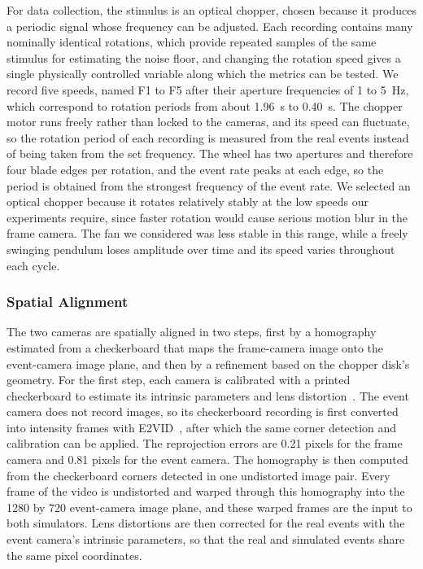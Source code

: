 
For data collection, the stimulus is an optical chopper, chosen because it produces a periodic signal whose frequency can be adjusted. Each recording contains many nominally identical rotations, which provide repeated samples of the same stimulus for estimating the noise floor, and changing the rotation speed gives a single physically controlled variable along which the metrics can be tested. We record five speeds, named F1 to F5 after their aperture frequencies of 1 to 5~Hz, which correspond to rotation periods from about 1.96~s to 0.40~s. The chopper motor runs freely rather than locked to the cameras, and its speed can fluctuate, so the rotation period of each recording is measured from the real events instead of being taken from the set frequency. The wheel has two apertures and therefore four blade edges per rotation, and the event rate peaks at each edge, so the period is obtained from the strongest frequency of the event rate. We selected an optical chopper because it rotates relatively stably at the low speeds our experiments require, since faster rotation would cause serious motion blur in the frame camera. The fan we considered was less stable in this range, while a freely swinging pendulum loses amplitude over time and its speed varies throughout each cycle.

\subsubsection{Spatial Alignment}
\label{sec:spatial-alignment}

The two cameras are spatially aligned in two steps, first by a homography estimated from a checkerboard that maps the frame-camera image onto the event-camera image plane, and then by a refinement based on the chopper disk's geometry. For the first step, each camera is calibrated with a printed checkerboard to estimate its intrinsic parameters and lens distortion~\cite{zhang2000flexible}. The event camera does not record images, so its checkerboard recording is first converted into intensity frames with E2VID~\cite{rebecq2021e2vid}, after which the same corner detection and calibration can be applied. The reprojection errors are 0.21 pixels for the frame camera and 0.81 pixels for the event camera. The homography is then computed from the checkerboard corners detected in one undistorted image pair. Every frame of the video is undistorted and warped through this homography into the 1280 by 720 event-camera image plane, and these warped frames are the input to both simulators. Lens distortions are then corrected for the real events with the event camera's intrinsic parameters, so that the real and simulated events share the same pixel coordinates.

